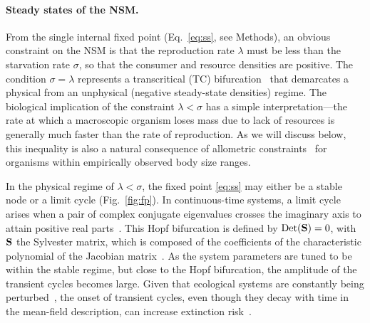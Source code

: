 \documentclass[twocolumn,preprintnumbers,amsmath,amssymb,superscriptaddress]{revtex4}
\begin{document}
\begin{bibunit}[unsrt]


  \noindent \paragraph*{ {\bf Steady states of the NSM.}} From the single
  internal fixed point (Eq.~\eqref{eq:ss}, see Methods), an obvious constraint
  on the NSM is that the reproduction rate $\lambda$ must be less than the
  starvation rate $\sigma$, so that the consumer and resource densities are
  positive.
  The condition $\sigma = \lambda$ represents a transcritical (TC)
  bifurcation~\citep{Strogatz:2008wo} that demarcates a physical from an
  unphysical (negative steady-state densities) regime.  The biological
  implication of the constraint $\lambda<\sigma$ has a simple
  interpretation---the rate at which a macroscopic organism loses mass due to
  lack of resources is generally much faster than the rate of reproduction.  As
  we will discuss below, this inequality is also a natural consequence of
  allometric constraints~\citep{Kempes:2012hy} for organisms within empirically
  observed body size ranges. %

  In the physical regime of $\lambda<\sigma$, the fixed point \eqref{eq:ss} may either be a stable node or a limit cycle (Fig.~\ref{fig:fp}).
  In continuous-time systems, a limit cycle arises when a pair of complex conjugate eigenvalues crosses the imaginary axis to attain positive real parts~\citep{GuckHolmes}.
  This Hopf bifurcation is defined by ${\rm Det}({\bf S}) = 0$, with $\bf S$ the Sylvester matrix, which is composed of the coefficients of the characteristic polynomial of the Jacobian matrix~\citep{Gross:2004p2428}.
  As the system parameters are tuned to be within the stable regime, but close to the Hopf bifurcation, the amplitude of the transient cycles becomes large.
  Given that ecological systems are constantly being perturbed~\citep{Hastings:2001jh}, the onset of transient cycles, even though they decay with time in the mean-field description, can increase extinction risk~\citep{Neubert:1997wk,Caswell:2005eo,Neubert:2009td}.


\end{bibunit}
\end{document}
